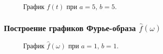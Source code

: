 \documentclass[a5paper, 10pt]{article}
\theoremstyle{definition}
\theoremstyle{plain}
\theoremstyle{remark}
\begin{document}
\begin{figure}[h!]
\caption{График $f(t)$ при $a = 5$, $b = 5$.}
\end{figure}




\newpage
\subsubsection{Построение графиков Фурье-образа $\hat{f} (\omega)$}

\begin{figure}[h!]
\caption{График $\hat{f}(\omega)$ при $a = 1$, $b = 1$.}
\end{figure}
\end{document}
